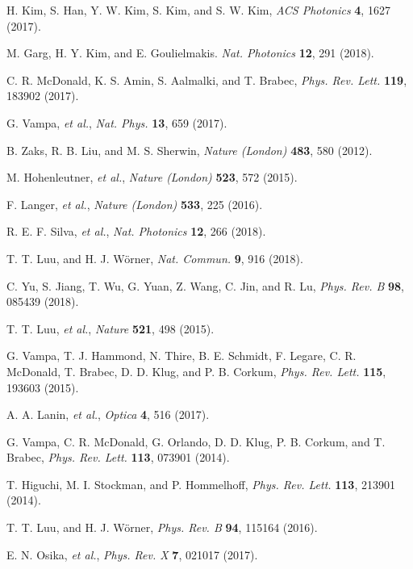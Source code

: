 \documentclass[aps,prl,10pt,preprint,nofootinbib]{revtex4-1}
\begin{document}
\begin{thebibliography}{99}
	
 H. Kim, S. Han, Y. W. Kim, S. Kim, and S. W. Kim, {\it ACS Photonics} \textbf{4}, 1627 (2017).

 M. Garg, H. Y. Kim, and E. Goulielmakis. {\it Nat. Photonics} \textbf{12}, 291 (2018).

 C. R. McDonald, K. S. Amin, S. Aalmalki, and T. Brabec, {\it Phys. Rev. Lett.} \textbf{119}, 183902 (2017).

 G. Vampa, {\it et al.}, {\it Nat. Phys.} \textbf{13}, 659 (2017).

 B. Zaks, R. B. Liu, and M. S. Sherwin, {\it Nature (London)} \textbf{483}, 580 (2012).

 M. Hohenleutner, {\it et al.}, {\it Nature (London)} \textbf{523}, 572 (2015).

 F. Langer, {\it et al.}, {\it Nature (London)} \textbf{533}, 225 (2016).

 R. E. F. Silva, {\it et al.}, {\it Nat. Photonics} \textbf{12}, 266 (2018).

 T. T. Luu, and H. J. W\"{o}rner, {\it Nat. Commun.} \textbf{9}, 916 (2018).

 C. Yu, S. Jiang, T. Wu, G. Yuan, Z. Wang, C. Jin, and R. Lu, {\it Phys. Rev. B} \textbf{98}, 085439 (2018).

 T. T. Luu, {\it et al.}, {\it Nature} \textbf{521}, 498 (2015).

 G. Vampa, T. J. Hammond, N. Thire, B. E. Schmidt, F. Legare, C. R. McDonald, T. Brabec, D. D. Klug, and P. B. Corkum, {\it Phys. Rev. Lett.} \textbf{115}, 193603 (2015).

 A. A. Lanin, {\it et al.}, {\it Optica} \textbf{4}, 516 (2017).

 G. Vampa, C. R. McDonald, G. Orlando, D. D. Klug, P. B. Corkum, and T. Brabec, {\it Phys. Rev. Lett.} \textbf{113}, 073901 (2014).

 T. Higuchi, M. I. Stockman, and P. Hommelhoff, {\it Phys. Rev. Lett.} \textbf{113}, 213901 (2014).

 T. T. Luu, and H. J. W\"{o}rner, {\it Phys. Rev. B} \textbf{94}, 115164 (2016).

 E. N. Osika, {\it et al.}, {\it Phys. Rev. X} \textbf{7}, 021017 (2017).


\end{thebibliography}
\end{document}
